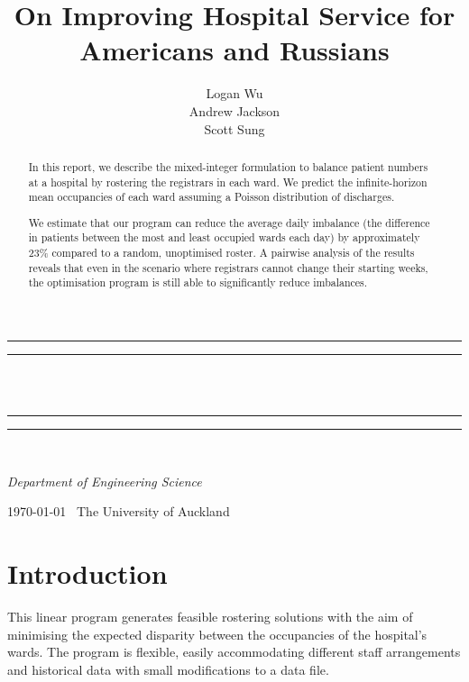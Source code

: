 \documentclass[a4paper]{article}
\title{On Improving Hospital Service for Americans and Russians}
\author{Logan Wu\\Andrew Jackson\\Scott Sung}
\newlength{\drop}
\begin{document}
\begin{titlepage}
    \textheight
    \centering
    \vspace*{\baselineskip}
    \rule{\textwidth}{1.6pt}\vspace*{-\baselineskip}\vspace*{2pt}
    \rule{\textwidth}{0.4pt}\\[\baselineskip]
    {\LARGE \@title}\\[0.2\baselineskip]
    \rule{\textwidth}{0.4pt}\vspace*{-\baselineskip}\vspace{3.2pt}
    \rule{\textwidth}{1.6pt}\\[\baselineskip]
    \vspace*{2\baselineskip}
    {\Large \textsc{\@author}\par}
    {\itshape Department of Engineering Science\par}
    \vspace*{2\baselineskip}
    {\scshape \today} \        {\large The University of Auckland}\par
    \vspace{\fill}
    \begin{abstract}
    In this report, we describe the mixed-integer formulation to balance patient numbers at a hospital by rostering the registrars in each ward. We predict the infinite-horizon mean occupancies of each ward assuming a Poisson distribution of discharges.
    
We estimate that our program can reduce the average daily imbalance (the difference in patients between the most and least occupied wards each day) by approximately 23\% compared to a random, unoptimised roster. A pairwise analysis of the results reveals that even in the scenario where registrars cannot change their starting weeks, the optimisation program is still able to significantly reduce imbalances.
    \end{abstract}
    \vspace{\fill}
\end{titlepage}
\makeatother
\pagestyle{fancy}

\section{Introduction}

This linear program generates feasible rostering solutions with the aim of minimising the expected disparity between the occupancies of the hospital's wards. The program is flexible, easily accommodating different staff arrangements and historical data with small modifications to a data file.
\end{document}
